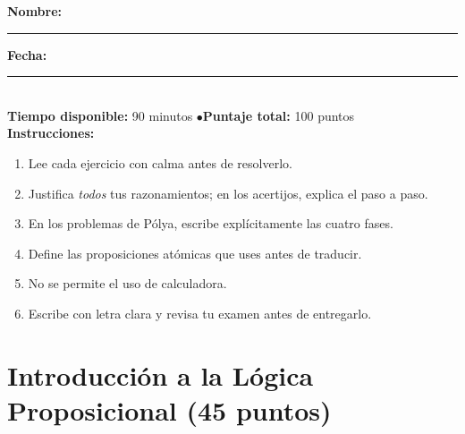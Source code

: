 \documentclass[12pt, letterpaper]{article}
\begin{document}


\vspace{4pt}
\begin{cuadroinfo}
  \small
  \textbf{Nombre:} \rule{0.55\linewidth}{0.4pt} \quad \textbf{Fecha:} \rule{0.15\linewidth}{0.4pt} \\[6pt]
  \textbf{Tiempo disponible:} 90 minutos \quad$\bullet$\quad \textbf{Puntaje total:} 100 puntos \\[4pt]
  \textbf{Instrucciones:}
  \begin{enumerate}[leftmargin=*]
    \item Lee cada ejercicio con calma antes de resolverlo.
    \item Justifica \emph{todos} tus razonamientos; en los acertijos, explica el paso a paso.
    \item En los problemas de Pólya, escribe explícitamente las cuatro fases.
    \item Define las proposiciones atómicas que uses antes de traducir.
    \item No se permite el uso de calculadora.
    \item Escribe con letra clara y revisa tu examen antes de entregarlo.
  \end{enumerate}
\end{cuadroinfo}

\vspace{8pt}

\section{Introducción a la Lógica Proposicional (45 puntos)}
\end{document}
